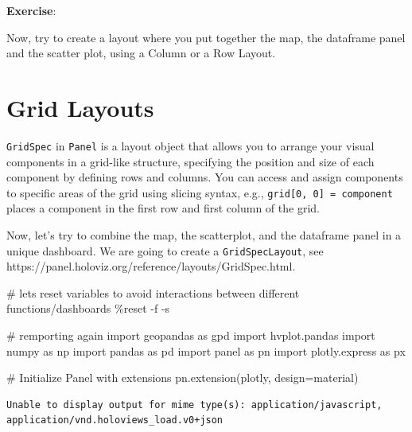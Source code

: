 \documentclass[
  letterpaper,
  DIV=11,
  numbers=noendperiod]{scrreprt}
\newenvironment{Shaded}{\begin{snugshade}}{\end{snugshade}}
\newcommand{\CommentTok}[1]{\textcolor[rgb]{0.37,0.37,0.37}{#1}}
\newcommand{\ImportTok}[1]{\textcolor[rgb]{0.00,0.46,0.62}{#1}}
\newcommand{\NormalTok}[1]{\textcolor[rgb]{0.00,0.23,0.31}{#1}}
\newcommand{\OperatorTok}[1]{\textcolor[rgb]{0.37,0.37,0.37}{#1}}
\newcommand{\StringTok}[1]{\textcolor[rgb]{0.13,0.47,0.30}{#1}}
\begin{document}
\textbf{Exercise}:

Now, try to create a layout where you put together the map, the
dataframe panel and the scatter plot, using a Column or a Row Layout.

\hypertarget{grid-layouts}{%
\section{Grid Layouts}\label{grid-layouts}}

\texttt{GridSpec} in \texttt{Panel} is a layout object that allows you
to arrange your visual components in a grid-like structure, specifying
the position and size of each component by defining rows and columns.
You can access and assign components to specific areas of the grid using
slicing syntax, e.g., \texttt{grid{[}0,\ 0{]}\ =\ component} places a
component in the first row and first column of the grid.

Now, let's try to combine the map, the scatterplot, and the dataframe
panel in a unique dashboard. We are going to create a
\texttt{GridSpecLayout}, see
https://panel.holoviz.org/reference/layouts/GridSpec.html.

\begin{Shaded}
\begin{Highlighting}[]
\CommentTok{\# let\textquotesingle{}s reset variables to avoid interactions between different functions/dashboards}
\OperatorTok{\%}\NormalTok{reset }\OperatorTok{{-}}\NormalTok{f }\OperatorTok{{-}}\NormalTok{s}

\CommentTok{\# remporting again}
\ImportTok{import}\NormalTok{ geopandas }\ImportTok{as}\NormalTok{ gpd}
\ImportTok{import}\NormalTok{ hvplot.pandas}
\ImportTok{import}\NormalTok{ numpy }\ImportTok{as}\NormalTok{ np}
\ImportTok{import}\NormalTok{ pandas }\ImportTok{as}\NormalTok{ pd}
\ImportTok{import}\NormalTok{ panel }\ImportTok{as}\NormalTok{ pn}
\ImportTok{import}\NormalTok{ plotly.express }\ImportTok{as}\NormalTok{ px}

\CommentTok{\# Initialize Panel with extensions}
\NormalTok{pn.extension(}\StringTok{\textquotesingle{}plotly\textquotesingle{}}\NormalTok{, design}\OperatorTok{=}\StringTok{\textquotesingle{}material\textquotesingle{}}\NormalTok{)}
\end{Highlighting}
\end{Shaded}

\begin{verbatim}
Unable to display output for mime type(s): application/javascript, application/vnd.holoviews_load.v0+json
\end{verbatim}
\end{document}
